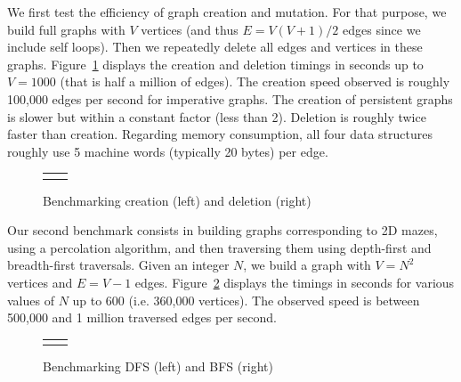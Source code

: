 \documentclass[]{tfp05symp}
\begin{document}
We first test the efficiency of graph creation and mutation. 
For that purpose, we build full graphs with $V$ vertices (and thus
$E=V(V+1)/2$ edges since we include self loops). 
Then we repeatedly delete all edges and vertices in these graphs. 
Figure~\ref{fig:bench:build} displays the creation and deletion
timings in seconds up to $V=1000$ (that is half a million of edges). 
The creation speed observed is roughly 100,000 edges per second for
imperative graphs. The creation of persistent graphs is slower but
within a constant factor (less than 2). Deletion is roughly twice
faster than creation.
Regarding memory consumption, all four data structures roughly use 5
machine words (typically 20 bytes) per edge.

\begin{figure}
  \centering\hspace*{-2em}
  \begin{tabular}{cc}
  \begin{minipage}{0.5\linewidth}
    
  \end{minipage} &
  \begin{minipage}{0.5\linewidth}
  
  \end{minipage}
  \end{tabular}
  \caption{Benchmarking creation (left) and deletion (right)}
  \label{fig:bench:build}
\end{figure}

Our second benchmark consists in building graphs corresponding to 2D
mazes, using a percolation algorithm, and then traversing them using
depth-first and breadth-first traversals. Given an integer $N$, we
build a graph with $V=N^2$ vertices and $E=V-1$
edges. Figure~\ref{fig:bench:maze} displays the timings in seconds for various
values of $N$ up to 600 (i.e. 360,000 vertices). The observed speed is
between 500,000 and 1 million traversed edges per second.

% 

\begin{figure}
  \centering\hspace*{-2em}
  \begin{tabular}{cc}
  \begin{minipage}{0.5\linewidth}

  \end{minipage} &
  \begin{minipage}{0.5\linewidth}

  \end{minipage}
  \end{tabular}
  \caption{Benchmarking DFS (left) and BFS (right)}
  \label{fig:bench:maze}
\end{figure}
\end{document}
